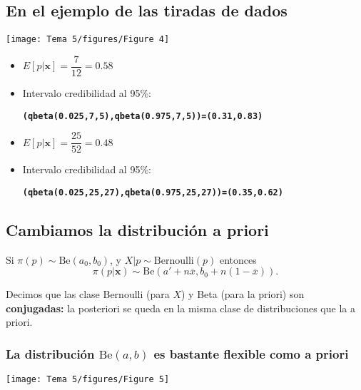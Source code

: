 \subsection*{En el ejemplo de las tiradas de dados}
\begin{minipage}{0.45\textwidth}
\texttt{[image: Tema 5/figures/Figure 4]}
\end{minipage} \begin{minipage}{0.59\textwidth}
\begin{tcolorbox}[colback=blue!5!white, colframe=blue!75!black, title=\textbf{Cuando usamos las 10 primeras observaciones }]
\begin{itemize}[label=\textbullet]
    \item $E[p|\mathbf{x}]=\dfrac{7}{12}=0.58$ 
    \item Intervalo credibilidad al 95\%:

        \textbf{\texttt{(qbeta(0.025,7,5),qbeta(0.975,7,5))=(0.31,0.83)}}
\end{itemize}
\end{tcolorbox}
\begin{tcolorbox}[colback=blue!5!white, colframe=blue!75!black, title=\textbf{Cuando usamos las 50 observaciones}]
\begin{itemize}[label=\textbullet]
    \item $E[p|\mathbf{x}]=\dfrac{25}{52}=0.48$ 
    \item Intervalo credibilidad al 95\%:

        \textbf{\texttt{(qbeta(0.025,25,27),qbeta(0.975,25,27))=(0.35,0.62)}}
\end{itemize}
\end{tcolorbox}
\end{minipage}
\subsection{Cambiamos la distribución a priori}
Si $\pi(p)\sim \mathrm{Be}(a_0,b_0)$, y $X|p\sim \mathrm{Bernoulli}(p)$ entonces \[
\pi(p|\mathbf{x})\sim \mathrm{Be}(a'+n\overline{x},b_0+n(1-\overline{x})).
\] 
\begin{tcolorbox}[colback=olive!5!white, colframe=olive!75!black, title=\textbf{Clases conjugadas}]
Decimos que las clase Bernoulli (para $X$) y Beta (para la priori) son \textbf{conjugadas:} la posteriori se queda en la misma clase de distribuciones que la a priori.
\end{tcolorbox}
\subsubsection{La distribución $\mathrm{Be}(a,b)$ es bastante flexible como a priori}
\texttt{[image: Tema 5/figures/Figure 5]}
